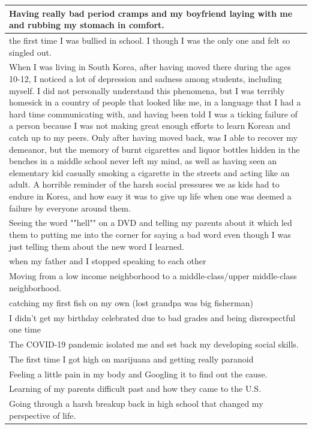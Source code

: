 \documentclass[
  .7em,
  letterpaper,
  DIV=11,
  numbers=noendperiod]{scrartcl}
\begin{document}
\begin{table}
\begin{tabular}{l}
\hline
Having really bad period cramps and my boyfriend laying with me and rubbing my stomach in comfort.\\
\hline
the first time I was bullied in school. I though I was the only one and felt so singled out.\\
\hline
When I was living in South Korea, after having moved there during the ages 10-12, I noticed a lot of depression and sadness among students, including myself. I did not personally understand this phenomena, but I was terribly homesick in a country of people that looked like me, in a language that I had a hard time communicating with, and having been told I was a ticking failure of a person because I was not making great enough efforts to learn Korean and catch up to my peers. Only after having moved back, was I able to recover my demeanor, but the memory of burnt cigarettes and liquor bottles hidden in the benches in a middle school never left my mind, as well as having seen an elementary kid casually smoking a cigarette in the streets and acting like an adult. A horrible reminder of the harsh social pressures we as kids had to endure in Korea, and how easy it was to give up life when one was deemed a failure by everyone around them.\\
\hline
Seeing the word ""hell"" on a DVD and telling my parents about it which led them to putting me into the corner for saying a bad word even though I was just telling them about the new word I learned.\\
\hline
when my father and I stopped speaking to each other\\
\hline
Moving from a low income neighborhood to a middle-class/upper middle-class neighborhood.\\
\hline
catching my first fish on my own (lost grandpa was big fisherman)\\
\hline
I didn't get my birthday celebrated due to bad grades and being disrespectful one time\\
\hline
The COVID-19 pandemic isolated me and set back my developing social skills.\\
\hline
The first time I got high on marijuana and getting really paranoid\\
\hline
Feeling a little pain in my body and Googling it to find out the cause.\\
\hline
Learning of my parents difficult past and how they came to the U.S.\\
\hline
Going through a harsh breakup back in high school that changed my perspective of life.\\

\end{tabular}
\end{table}
\end{document}
